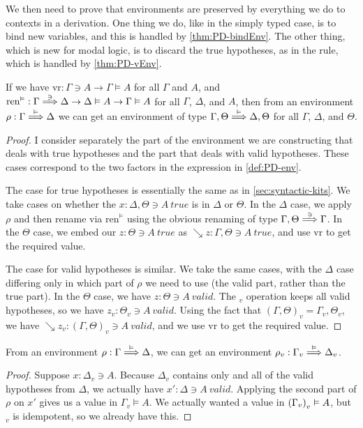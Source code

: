 We then need to prove that environments are preserved by everything we do to
contexts in a derivation.
One thing we do, like in the simply typed case, is to bind new variables, and
this is handled by \cref{thm:PD-bindEnv}.
The other thing, which is new for modal logic, is to discard the true
hypotheses, as in the  rule, which is handled by
\cref{thm:PD-vEnv}.

\begin{lemma}[bindEnv]\label{thm:PD-bindEnv}
  If we have $\mathrm{vr} : \Gamma \ni A \to \Gamma \vDash A$ for all
  $\Gamma$ and $A$, and
  $\mathrm{ren}^\vDash :
  \Gamma \stackrel{\ni}\Longrightarrow \Delta \to \Delta \vDash A \to \Gamma \vDash A$
  for all $\Gamma$, $\Delta$, and $A$,
  then from an environment $\rho : \Gamma \stackrel{\vDash}\Longrightarrow \Delta$
  we can get an environment of type $\Gamma, \Theta \stackrel{\vDash}\Longrightarrow \Delta, \Theta$
  for all $\Gamma$, $\Delta$, and $\Theta$.
\end{lemma}
\begin{proof}
  I consider separately the part of the environment we are constructing that
  deals with true hypotheses and the part that deals with valid hypotheses.
  These cases correspond to the two factors in the expression in
  \cref{def:PD-env}.

  The case for true hypotheses is essentially the same as in
  \cref{sec:syntactic-kits}.
  We take cases on whether the $x : \Delta, \Theta \ni A~\mathit{true}$ is in
  $\Delta$ or $\Theta$.
  In the $\Delta$ case, we apply $\rho$ and then rename via
  $\mathrm{ren}^\vDash$ using the obvious renaming of type
  $\Gamma, \Theta \stackrel{\ni}\Longrightarrow \Gamma$.
  In the $\Theta$ case, we embed our $z : \Theta \ni A~\mathit{true}$ as
  $\searrow z : \Gamma, \Theta \ni A~\mathit{true}$, and use $\mathrm{vr}$ to
  get the required value.

  The case for valid hypotheses is similar.
  We take the same cases, with the $\Delta$ case differing only in which part of
  $\rho$ we need to use (the valid part, rather than the true part).
  In the $\Theta$ case, we have $z : \Theta \ni A~\mathit{valid}$.
  The $_v$ operation keeps all valid hypotheses, so we have
  $z_v : \Theta_v \ni A~\mathit{valid}$.
  Using the fact that $(\Gamma, \Theta)_v = \Gamma_v, \Theta_v$, we have
  $\searrow z_v : (\Gamma, \Theta)_v \ni A~\mathit{valid}$, and we use
  $\mathrm{vr}$ to get the required value.
\end{proof}

\begin{lemma}\label{thm:PD-vEnv}
  From an environment $\rho : \Gamma \stackrel{\vDash}\Longrightarrow \Delta$, we can get an
  environment $\rho_v : \Gamma_v \stackrel{\vDash}\Longrightarrow \Delta_v$.
\end{lemma}
\begin{proof}
  Suppose $x : \Delta_v \ni A$.
  Because $\Delta_v$ contains only and all of the valid hypotheses from
  $\Delta$, we actually have $x' : \Delta \ni A~\mathit{valid}$.
  Applying the second part of $\rho$ on $x'$ gives us a value in
  $\Gamma_v \vDash A$.
  We actually wanted a value in $\plr{\Gamma_v}_v \vDash A$, but $_v$ is
  idempotent, so we already have this.
\end{proof}

